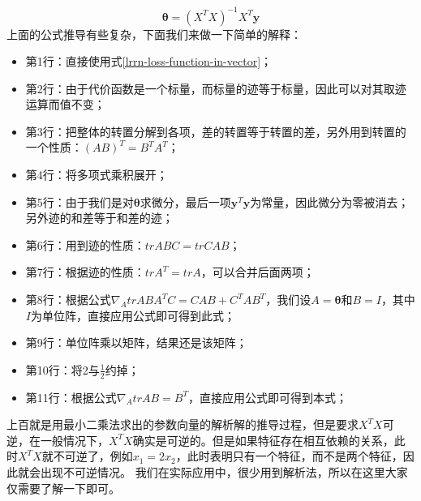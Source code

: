 \documentclass[UTF8]{article}
\begin{document}
\begin{equation}
\boldsymbol{\theta} = (X^{T}X)^{-1}X^{T}\boldsymbol{y}
\label{lrrn-theta-star}
\end{equation}
上面的公式推导有些复杂，下面我们来做一下简单的解释：
\begin{itemize}
\item 第1行：直接使用式\ref{lrrn-loss-function-in-vector}；
\item 第2行：由于代价函数是一个标量，而标量的迹等于标量，因此可以对其取迹运算而值不变；
\item 第3行：把整体的转置分解到各项，差的转置等于转置的差，另外用到转置的一个性质：$(AB)^{T}=B^{T}A^{T}$；
\item 第4行：将多项式乘积展开；
\item 第5行：由于我们是对$\boldsymbol{\theta}$求微分，最后一项$\boldsymbol{y}^{T}\boldsymbol{y}$为常量，因此微分为零被消去；另外迹的和差等于和差的迹；
\item 第6行：用到迹的性质：$trABC=trCAB$；
\item 第7行：根据迹的性质：$trA^{T}=trA$，可以合并后面两项；
\item 第8行：根据公式$\nabla _{A} trABA^{T}C = CAB + C^{T}AB^{T}$，我们设$A=\boldsymbol{\theta}$和$B=I$，其中$I$为单位阵，直接应用公式即可得到此式；
\item 第9行：单位阵乘以矩阵，结果还是该矩阵；
\item 第10行：将2与$\frac{1}{2}$约掉；
\item 第11行：根据公式$\nabla _{A} trAB = B^{T}$，直接应用公式即可得到本式；
\end{itemize}
上百就是用最小二乘法求出的参数向量的解析解的推导过程，但是要求$X^{T}X$可逆，在一般情况下，$X^{T}X$确实是可逆的。但是如果特征存在相互依赖的关系，此时$X^{T}X$就不可逆了，例如$x_{1} = 2x_{2}$，此时表明只有一个特征，而不是两个特征，因此就会出现不可逆情况。\newline
我们在实际应用中，很少用到解析法，所以在这里大家仅需要了解一下即可。
\end{document}
